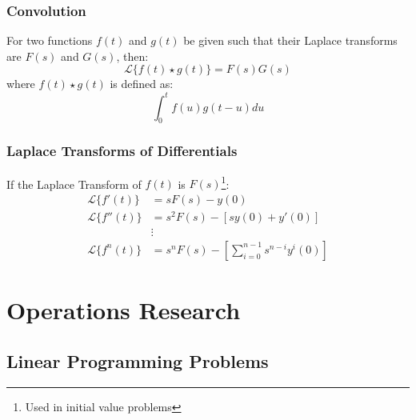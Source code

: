 \documentclass[openany, oneside]{book}
\begin{document}
\section{Convolution}
For two functions $f(t)$ and $g(t)$ be given such that their Laplace transforms are $F(s)$ and $G(s)$, then:
\begin{equation}
\mathcal{L}\lbrace f(t) \star g(t) \rbrace=F(s)G(s)
\end{equation}
where $f(t) \star g(t)$ is defined as:
\begin{equation}
\int_0^t f(u)g(t-u)du
\end{equation}

\section{Laplace Transforms of Differentials}
If the Laplace Transform of $f(t)$ is $F(s)$\footnote{Used in initial value problems}:
\begin{align}
\mathcal{L}\lbrace f'(t) \rbrace & =sF(s)-y(0)\\
\mathcal{L}\lbrace f''(t) \rbrace & = s^2 F(s)-[s y(0)+y'(0)]\\
&\vdots\nonumber\\
\mathcal{L}\lbrace f^n(t) \rbrace & = s^n F(s)-[\sum_{i=0}^{n-1}s^{n-i}y^i(0)]
\end{align}


\part{Operations Research}
\chapter{Linear Programming Problems}
\end{document}
